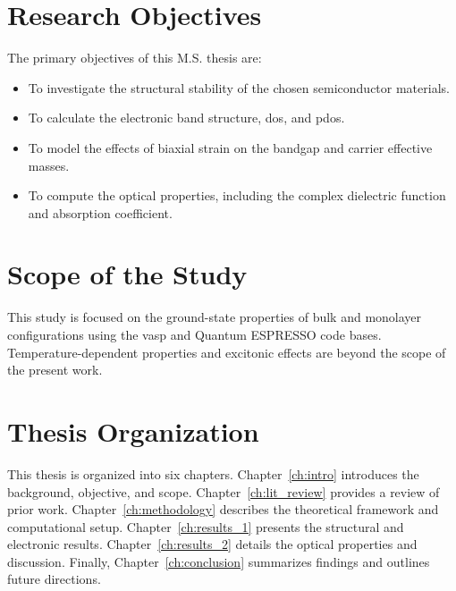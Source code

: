 \section{Research Objectives}
The primary objectives of this M.S. thesis are:
\begin{itemize}
    \item To investigate the structural stability of the chosen semiconductor materials.
    \item To calculate the electronic band structure, \gls{dos}, and \gls{pdos}.
    \item To model the effects of biaxial strain on the bandgap and carrier effective masses.
    \item To compute the optical properties, including the complex dielectric function and absorption coefficient.
\end{itemize}

\section{Scope of the Study}
This study is focused on the ground-state properties of bulk and monolayer configurations using the \gls{vasp} and Quantum ESPRESSO code bases. Temperature-dependent properties and excitonic effects are beyond the scope of the present work.

\section{Thesis Organization}
This thesis is organized into six chapters. Chapter~\ref{ch:intro} introduces the background, objective, and scope. Chapter~\ref{ch:lit_review} provides a review of prior work. Chapter~\ref{ch:methodology} describes the theoretical framework and computational setup. Chapter~\ref{ch:results_1} presents the structural and electronic results. Chapter~\ref{ch:results_2} details the optical properties and discussion. Finally, Chapter~\ref{ch:conclusion} summarizes findings and outlines future directions.

